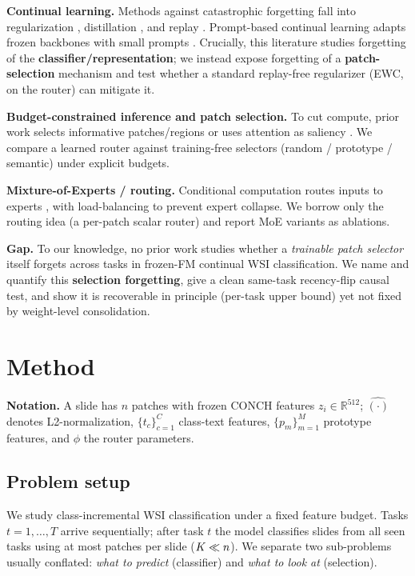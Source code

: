 \noindent\textbf{Continual learning.} Methods against catastrophic forgetting
fall into regularization \cite{kirkpatrick2017ewc}, distillation
\cite{li2017lwf}, and replay
\cite{rebuffi2017icarl,chaudhry2019agem,buzzega2020der}. Prompt-based continual
learning adapts frozen backbones with small prompts
\cite{wang2022l2p,wang2022dualprompt,smith2023coda}. Crucially, this literature
studies forgetting of the \textbf{classifier/representation}; we instead expose
forgetting of a \textbf{patch-selection} mechanism and test whether a standard
replay-free regularizer (EWC, on the router) can mitigate it.

\noindent\textbf{Budget-constrained inference and patch selection.} To cut
compute, prior work selects informative patches/regions \cite{bergner2023ips}
or uses attention as saliency \cite{ilse2018abmil}. We compare a learned router
against training-free selectors (random / prototype / semantic) under explicit
budgets.

\noindent\textbf{Mixture-of-Experts / routing.} Conditional computation routes
inputs to experts \cite{shazeer2017moe,fedus2022switch}, with load-balancing to
prevent expert collapse. We borrow only the routing idea (a per-patch scalar
router) and report MoE variants as ablations.

\noindent\textbf{Gap.} To our knowledge, no prior work studies whether a
\emph{trainable patch selector} itself forgets across tasks in frozen-FM
continual WSI classification. We name and quantify this \textbf{selection
forgetting}, give a clean same-task recency-flip causal test, and show it is
recoverable in principle (per-task upper bound) yet not fixed by weight-level
consolidation.

\section{Method}
\label{sec:method}

\noindent\textbf{Notation.} A slide has $n$ patches with frozen CONCH features
$z_i\in\mathbb{R}^{512}$; $\hat{(\cdot)}$ denotes L2-normalization,
$\{t_c\}_{c=1}^{C}$ class-text features, $\{p_m\}_{m=1}^{M}$ prototype features,
and $\phi$ the router parameters.

\subsection{Problem setup}
We study class-incremental WSI classification under a fixed feature budget.
Tasks $t=1,\dots,T$ arrive sequentially; after task $t$ the model classifies
slides from all seen tasks using at most \K{} patches per slide ($K\ll n$). We
separate two sub-problems usually conflated: \emph{what to predict}
(classifier) and \emph{what to look at} (selection).

